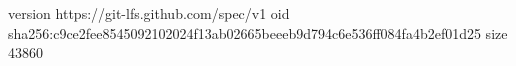 version https://git-lfs.github.com/spec/v1
oid sha256:c9ce2fee8545092102024f13ab02665beeeb9d794c6e536ff084fa4b2ef01d25
size 43860

